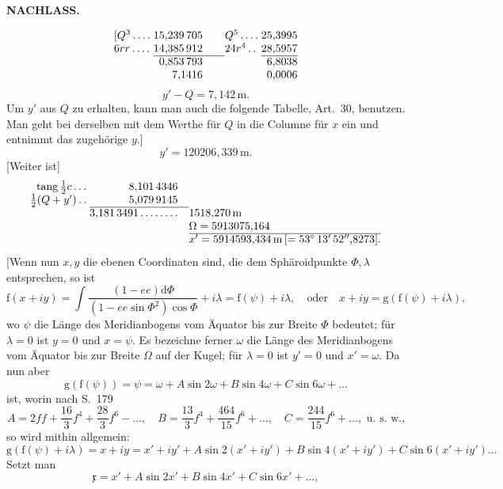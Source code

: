 \par\clearpage
{}\hfill{\small\textbf{NACHLASS.}}\hfill\null\par\medskip
\[
\begin{array}{@{}l@{\;}r@{\qquad}l@{\;}r@{}}
[Q^3\,.\,.\,.\,.&15{,}239\,705&Q^5\,.\,.\,.\,.&25{,}3995\\
6rr\,.\,.\,.\,.&14{,}385\,912&24r^4\,.\,.&28{,}5957\\\cline{2-2}\cline{4-4}
&0{,}853\,793&&6{,}8038\\
&7{,}1416&&0{,}0006
\end{array}
\]
\[y'-Q=7{,}142\,\mathrm{m}.\]
Um \(y'\) aus \(Q\) zu erhalten, kann man auch die folgende Tabelle, Art.~30, benutzen. Man geht bei derselben mit dem Werthe für \(Q\) in die Columne für \(x\) ein und entnimmt das zugehörige \(y\).]
\[y'=120206{,}339\,\mathrm{m}.\]
[Weiter ist]
\[
\begin{array}{@{}r@{\;}r@{\quad}l@{}}
\operatorname{tang}\tfrac12c\,.\,.\,.&8{,}101\,4346&\\
\tfrac12(Q+y')\,.\,.&5{,}079\,9145&\\\cline{2-2}
&3{,}181\,3491\,.\,.\,.\,.\,.\,.\,.\,.&1518{,}270\,\mathrm{m}\\
&&\Omega=5913075{,}164\\\cline{3-3}
&&x'=5914593{,}434\,\mathrm{m}\,[=53^\circ\,13'\,52''{,}8273].
\end{array}
\]
[Wenn nun \(x,y\) die ebenen Coordinaten sind, die dem Sphäroidpunkte \(\Phi,\lambda\) entsprechen, so ist
\[
\mathrm{f}(x+iy)=\int\frac{(1-ee)\mathrm{d}\Phi}{(1-ee\sin\Phi^2)\cos\Phi}+i\lambda
=\mathrm{f}(\psi)+i\lambda,\quad\text{oder}\quad x+iy=\mathrm{g}(\mathrm{f}(\psi)+i\lambda),
\]
\noindent wo \(\psi\) die Länge des Meridianbogens vom Äquator bis zur Breite \(\Phi\) bedeutet; für \(\lambda=0\) ist \(y=0\) und \(x=\psi\). Es bezeichne ferner \(\omega\) die Länge des Meridianbogens vom Äquator bis zur Breite \(\Omega\) auf der Kugel; für \(\lambda=0\) ist \(y'=0\) und \(x'=\omega\). Da nun aber
\[
\mathrm{g}(\mathrm{f}(\psi))=\psi=\omega+A\sin2\omega+B\sin4\omega+C\sin6\omega+\ldots
\]
\noindent ist, worin nach S.~179
\[
A=2ff+\frac{16}{3}f^4+\frac{28}{3}f^6-\ldots,\quad
B=\frac{13}{3}f^4+\frac{464}{15}f^6+\ldots,\quad
C=\frac{244}{15}f^6+\ldots,\text{ u. s. w.,}
\]
\noindent so wird mithin allgemein:
\[
\mathrm{g}(\mathrm{f}(\psi)+i\lambda)=x+iy=x'+iy'+A\sin2(x'+iy')+B\sin4(x'+iy')+C\sin6(x'+iy')\ldots
\]
Setzt man
\[\mathfrak{x}=x'+A\sin2x'+B\sin4x'+C\sin6x'+\ldots,\]


